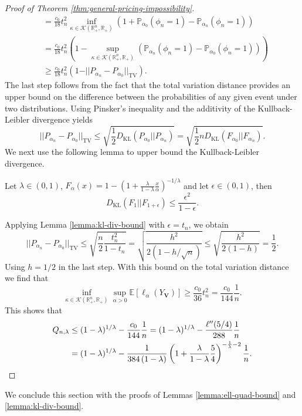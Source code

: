 \documentclass[11pt]{article}
\newcommand{\E}{\mathbb{E}}
\newcommand{\Rplus}{\mathbb{R}_+}
\newcommand{\Prob}{\mathbb{P}}
\begin{document}
\begin{proof}[Proof of Theorem \ref{thm:general-pricing-impossibility}]
\begin{align*}
    &= \frac{c_0}{18}t_n^2\inf_{\kappa\in \mathcal{K}(\Rplus^n,\Rplus)}\left(1+\Prob_{\alpha_0}(\phi_n=1)-\Prob_{\alpha_n}(\phi_n=1)\right)\\
    &= \frac{c_0}{18}t_n^2\left(1-\sup_{\kappa\in \mathcal{K}(\Rplus^n,\Rplus)}\left(\Prob_{\alpha_n}(\phi_n=1)-\Prob_{\alpha_0}(\phi_n=1)\right)\right)\\
    &\ge  \frac{c_0}{18}t_n^2\left(1-\vert\vert P_{\alpha_n}-P_{\alpha_0} \vert\vert_{\mathrm{TV}}\right).
\end{align*}
The last step follows from the fact that the total variation distance provides an upper bound on the difference between the probabilities of any given event under two distributions. Using Pinsker's inequality and the additivity of the Kullback-Leibler divergence yields
$$
\vert\vert P_{\alpha_n}-P_{\alpha_0}\vert\vert_{\mathrm{TV}}\le\sqrt{\frac{1}{2}D_{\mathrm{KL}}(P_{\alpha_0}||P_{\alpha_n})}=\sqrt{\frac{1}{2}nD_{\mathrm{KL}}(F_{\alpha_0}||F_{\alpha_n})}.
$$
We next use the following lemma to upper bound the Kullback-Leibler divergence.

\begin{lemma}
    \label{lemma:kl-div-bound}
    Let $\lambda\in(0,1)$, $F_\alpha(x)=1-\left(1+\frac{\lambda}{1-\lambda}\frac{x}{\alpha}\right)^{-1/\lambda}$ and let $\epsilon \in (0, 1)$, then
    $$
    D_{\mathrm{KL}}(F_{1}||F_{1+\epsilon})\le \frac{\epsilon^2}{1-\epsilon}.
    $$
\end{lemma}
Applying Lemma \ref{lemma:kl-div-bound} with $\epsilon = t_n$, we obtain
$$
\vert\vert P_{\alpha_n}-P_{\alpha_0}\vert\vert_{\mathrm{TV}}\le\sqrt{\frac{n}{2}\frac{t_n^2}{1-t_n}}=\sqrt{\frac{h^2}{2\left(1-h/\sqrt{n}\right)}}\le \sqrt{\frac{h^2}{2(1-h)}}=\frac{1}{2}.
$$
Using $h=1/2$ in the last step. With this bound on the total variation distance we find that
$$
    \inf_{\kappa\in \mathcal{K}(\Rplus^n,\Rplus)}\sup_{\alpha>0}\E[\ell_{\alpha}(Y_{\boldsymbol{V}})]\ge  \frac{c_0}{36}t_n^2=\frac{c_0}{144}\frac{1}{n}.
$$
This shows that
\begin{align*}
    Q_{n,\lambda}&\le (1-\lambda)^{1/\lambda}-\frac{c_0}{144}\frac{1}{n}=(1-\lambda)^{1/\lambda}-\frac{\ell''(5/4)}{288}\frac{1}{n}\\
    &=(1-\lambda)^{1/\lambda}-\frac{1}{384\left(1-\lambda\right)}\left(1+\frac{\lambda}{1-\lambda}\frac{5}{4}\right)^{-\frac{1}{\lambda}-2}\frac{1}{n}.  \qedhere
\end{align*}
\end{proof}


We conclude this section with the proofs of Lemmas \ref{lemma:ell-quad-bound} and \ref{lemma:kl-div-bound}.
\end{document}
